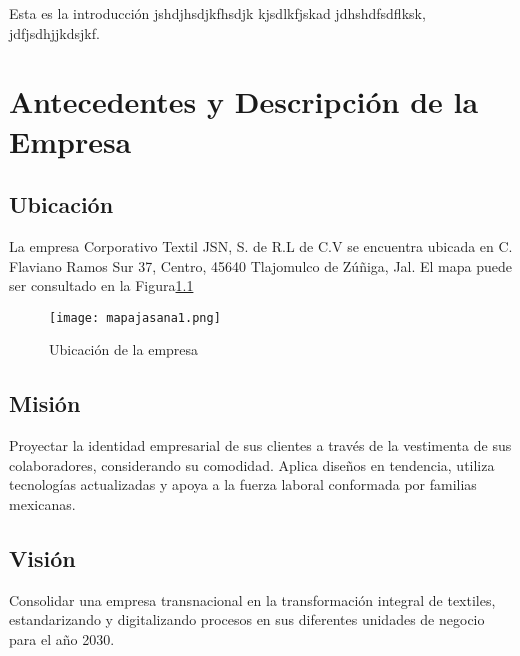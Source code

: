 \documentclass[12pt,letterpaper,spanish]{report}
\begin{document}
Esta es la introducción jshdjhsdjkfhsdjk kjsdlkfjskad jdhshdfsdflksk, jdfjsdhjjkdsjkf.



\chapter{Antecedentes y Descripción de la Empresa}
\newpage




\section{Ubicación}
La empresa Corporativo Textil JSN, S. de R.L de C.V se encuentra ubicada en C. Flaviano Ramos Sur 37, Centro, 45640 Tlajomulco de Zúñiga, Jal. El mapa puede ser consultado en la Figura\ref{a1}

\begin{figure}[htp]
  \centering
  \texttt{[image: mapajasana1.png]}
  \caption{Ubicación de la empresa}\label{a1}
\end{figure}




\section{Misión}
Proyectar la identidad empresarial de sus clientes a través de la vestimenta de sus colaboradores, considerando su comodidad. Aplica diseños en tendencia, utiliza tecnologías actualizadas y apoya a la fuerza laboral conformada por familias mexicanas.

\section{Visión}
Consolidar una empresa transnacional en la transformación integral de textiles, estandarizando y digitalizando procesos en sus diferentes unidades de negocio para el año 2030.
\end{document}
